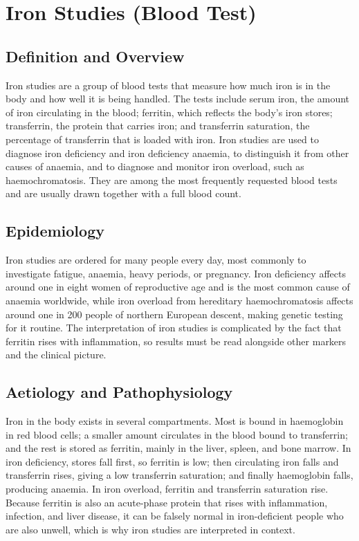 \chapter{Iron Studies (Blood Test)}

\section*{Definition and Overview}
Iron studies are a group of blood tests that measure how much iron is in the body and how well it is being handled. The tests include serum iron, the amount of iron circulating in the blood; ferritin, which reflects the body's iron stores; transferrin, the protein that carries iron; and transferrin saturation, the percentage of transferrin that is loaded with iron. Iron studies are used to diagnose iron deficiency and iron deficiency anaemia, to distinguish it from other causes of anaemia, and to diagnose and monitor iron overload, such as haemochromatosis. They are among the most frequently requested blood tests and are usually drawn together with a full blood count.

\section*{Epidemiology}
Iron studies are ordered for many people every day, most commonly to investigate fatigue, anaemia, heavy periods, or pregnancy. Iron deficiency affects around one in eight women of reproductive age and is the most common cause of anaemia worldwide, while iron overload from hereditary haemochromatosis affects around one in 200 people of northern European descent, making genetic testing for it routine. The interpretation of iron studies is complicated by the fact that ferritin rises with inflammation, so results must be read alongside other markers and the clinical picture.

\section*{Aetiology and Pathophysiology}
Iron in the body exists in several compartments. Most is bound in haemoglobin in red blood cells; a smaller amount circulates in the blood bound to transferrin; and the rest is stored as ferritin, mainly in the liver, spleen, and bone marrow. In iron deficiency, stores fall first, so ferritin is low; then circulating iron falls and transferrin rises, giving a low transferrin saturation; and finally haemoglobin falls, producing anaemia. In iron overload, ferritin and transferrin saturation rise. Because ferritin is also an acute-phase protein that rises with inflammation, infection, and liver disease, it can be falsely normal in iron-deficient people who are also unwell, which is why iron studies are interpreted in context.

